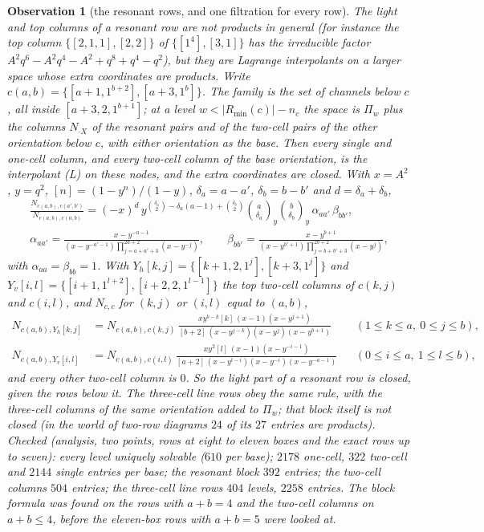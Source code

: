 \documentclass[11pt]{article}
\newtheorem{observation}{Observation}
\begin{document}
\begin{observation}[the resonant rows, and one filtration for every row]
The light and top columns of a resonant row are not products in general (for instance the top column
$\{[2,1,1],[2,2]\}$ of $\{[1^4],[3,1]\}$ has the irreducible factor $A^2q^6-A^2q^4-A^2+q^8+q^4-q^2$), but they are
Lagrange interpolants on a larger space whose extra coordinates are products.  Write $c(a,b)=\{[a+1,1^{b+2}],[a+3,1^b]\}$.  The family is the set of
channels below $c$, all inside $[a+3,2,1^{b+1}]$; at a level $w<|R_{\min}(c)|-n_c$ the space is $\Pi_w$ plus the columns
$N_{\cdot X}$ of the resonant pairs and of the two-cell pairs of the other orientation below $c$, with either orientation
as the base.  Then every single and one-cell column, and every two-cell column of the base orientation, is the
interpolant (L) on these nodes, and the extra coordinates are closed.  With $x=A^2$, $y=q^2$, $[n]=(1-y^n)/(1-y)$,
$\delta_a=a-a'$, $\delta_b=b-b'$ and $d=\delta_a+\delta_b$,
\begin{gather*}
\frac{N_{c(a,b),c(a',b')}}{N_{c(a,b),c(a,b)}}=(-x)^d\,y^{\binom{\delta_a}2-\delta_a(a-1)+\binom{\delta_b}2}
\binom a{\delta_a}_{\!y}\binom b{\delta_b}_{\!y}\,\alpha_{aa'}\,\beta_{bb'},\\
\alpha_{aa'}=\frac{x-y^{-a-1}}{(x-y^{-a'-1})\prod_{j=a+a'+3}^{2a+2}(x-y^{-j})},\qquad
\beta_{bb'}=\frac{x-y^{b+1}}{(x-y^{b'+1})\prod_{j=b+b'+3}^{2b+2}(x-y^{j})},
\end{gather*}
with $\alpha_{aa}=\beta_{bb}=1$.  With $Y_h[k,j]=\{[k+1,2,1^j],[k+3,1^j]\}$
and $Y_v[i,l]=\{[i+1,1^{l+2}],[i+2,2,1^{l-1}]\}$ the top two-cell columns of $c(k,j)$ and $c(i,l)$, and $N_{c,c}$ for
$(k,j)$ or $(i,l)$ equal to $(a,b)$,
\begin{align*}
N_{c(a,b),Y_h[k,j]}&=N_{c(a,b),c(k,j)}\,\frac{xy^{b-k}[k]\,(x-1)(x-y^{j+1})}{[b+2]\,(x-y^{j-k})(x-y^j)(x-y^{b+1})}
&&(1\le k\le a,\ 0\le j\le b),\\
N_{c(a,b),Y_v[i,l]}&=N_{c(a,b),c(i,l)}\,\frac{xy^{2}[l]\,(x-1)(x-y^{-i-1})}{[a+2]\,(x-y^{l-i})(x-y^{-i})(x-y^{-a-1})}
&&(0\le i\le a,\ 1\le l\le b),
\end{align*}
and every other two-cell column is $0$.  So the light part of a resonant row is closed, given the rows below it.  The
three-cell line rows obey the same rule, with the three-cell columns of the same orientation added to $\Pi_w$; that block
itself is not closed (in the world of two-row diagrams $24$ of its $27$ entries are products).  Checked (analysis, two
points, rows at eight to eleven boxes and the exact rows up to seven): every level uniquely solvable ($610$ per base);
$2178$ one-cell, $322$ two-cell and $2144$ single entries per base; the resonant block $392$ entries; the two-cell
columns $504$ entries; the three-cell line rows $404$ levels, $2258$ entries.  The block formula was found on the rows with
$a+b=4$ and the two-cell columns on $a+b\le4$, before the eleven-box rows with $a+b=5$ were looked at.
\end{observation}
\end{document}
